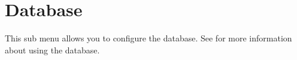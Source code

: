 \section{Database}
  This sub menu allows you to configure the database.
  See  for more information about using
  the database.
